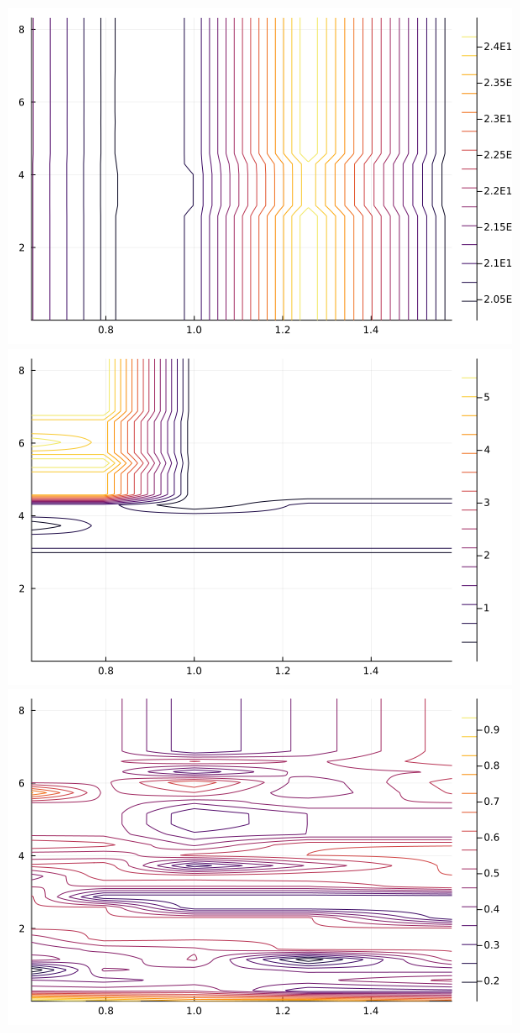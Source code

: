 \documentclass{article}
\begin{document}
\begin{center}
    \includegraphics*[scale = 0.6]{p7b.png}
    \includegraphics*[scale = 0.6]{p8b.png}
    \includegraphics*[scale = 0.6]{p9b.png}
\end{center}
\end{document}

